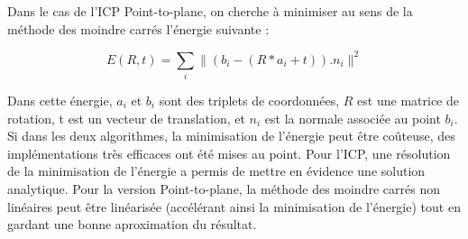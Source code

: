 Dans le cas de l'ICP Point-to-plane, on cherche à minimiser au sens de la méthode des moindre carrés l'énergie suivante :

\begin{equation}
E(R,t) = \sum_{i} \|(b_{i}-(R*a_{i} + t)).n_{i}\|^{2}
\end{equation}	

Dans cette énergie, $a_{i}$ et $b_{i}$ sont des triplets de coordonnées, $R$ est une matrice de rotation, t est un vecteur de translation, et $n_{i}$ est la normale associée au point $b_{i}$.\\

Si dans les deux algorithmes, la minimisation de l'énergie peut être coûteuse, des implémentations très efficaces ont été mises au point. Pour l'ICP, une résolution de la minimisation de l'énergie a permis de mettre en évidence une solution analytique. Pour la version Point-to-plane, la méthode des moindre carrés non linéaires peut être linéarisée (accélérant ainsi la minimisation de l'énergie) tout en gardant une bonne aproximation du résultat.
